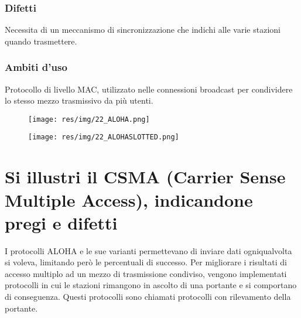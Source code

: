 \subsubsection{Difetti}
Necessita di un meccanismo di sincronizzazione che indichi alle varie stazioni quando trasmettere.

\subsubsection{Ambiti d'uso}
Protocollo di livello MAC, utilizzato nelle connessioni broadcast per condividere lo stesso mezzo trasmissivo da più utenti.

\begin{figure}[H]
\centering
\texttt{[image: res/img/22\_ALOHA.png]}
\end{figure}
\begin{figure}[H]
\centering
\texttt{[image: res/img/22\_ALOHASLOTTED.png]}
\end{figure}

\section{Si illustri il CSMA (Carrier Sense Multiple Access), indicandone pregi e difetti}

I protocolli ALOHA e le sue varianti permettevano di inviare dati ogniqualvolta si voleva, limitando però le percentuali di successo.
Per migliorare i risultati di accesso multiplo ad un mezzo di trasmissione condiviso, vengono implementati protocolli in cui le stazioni rimangono in ascolto di una portante e si comportano di conseguenza. Questi protocolli sono chiamati protocolli con rilevamento della portante.
